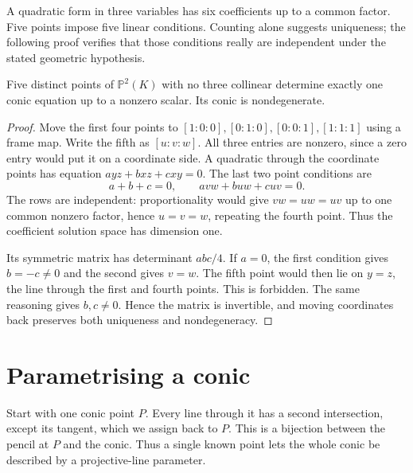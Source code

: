 A quadratic form in three variables has six coefficients up to a common factor. Five points impose five linear conditions. Counting alone suggests uniqueness; the following proof verifies that those conditions really are independent under the stated geometric hypothesis.

\begin{theorem}\label{geometry:thm:fivepoints}
Five distinct points of $\mathbb P^2(K)$ with no three collinear determine exactly one conic equation up to a nonzero scalar. Its conic is nondegenerate.
\end{theorem}
\begin{proof}
Move the first four points to $[1:0:0],[0:1:0],[0:0:1],[1:1:1]$ using a frame map. Write the fifth as $[u:v:w]$. All three entries are nonzero, since a zero entry would put it on a coordinate side. A quadratic through the coordinate points has equation $ayz+bxz+cxy=0$. The last two point conditions are
\[
a+b+c=0,\qquad avw+buw+cuv=0.
\]
The rows are independent: proportionality would give $vw=uw=uv$ up to one common nonzero factor, hence $u=v=w$, repeating the fourth point. Thus the coefficient solution space has dimension one.

Its symmetric matrix has determinant $abc/4$. If $a=0$, the first condition gives $b=-c\ne0$ and the second gives $v=w$. The fifth point would then lie on $y=z$, the line through the first and fourth points. This is forbidden. The same reasoning gives $b,c\ne0$. Hence the matrix is invertible, and moving coordinates back preserves both uniqueness and nondegeneracy.
\end{proof}

\section{Parametrising a conic}

Start with one conic point $P$. Every line through it has a second intersection, except its tangent, which we assign back to $P$. This is a bijection between the pencil at $P$ and the conic. Thus a single known point lets the whole conic be described by a projective-line parameter.

